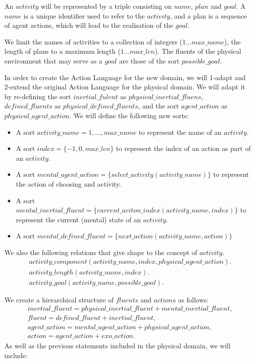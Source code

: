 \documentclass[11pt, oneside]{article}
\begin{document}
An $activity$ will be represented by a triple consisting on $name$, $plan$ and $goal$. A $name$ is a unique identifier used to refer to the $activity$, and a plan is a sequence of agent actions, which will lead to the realisation of the $goal$. 
 
We limit the names of activities to a collection of integers ($1\dots max\_name$), the length of plans to a maximum length ($1\dots max\_len$). The fluents of the physical environment that may serve as a $goal$ are those of the sort $possible\_goal$. 

In order to create the Action Language for the new domain, we will 1-adapt and 2-extend the original Action Language for the physical domain.
We will adapt it by re-defining the sort $inertial\_fulent$ as $physical\_inertial\_fluens$, $defined\_fluents$ as $physical\_defined\_fluents$, and the sort $agent\_action$ as $physical\_agent\_action$. We will define the following new sorts: 
\begin{itemize}
	\item A sort $activity\_name = {1,\dots, max\_name}$ to represent the name of an $activity$.	
	\item A sort $index = \{-1,0,max\_len\}$ to represent the index of an action as part of an $activity$. 
	\item A sort $mental\_agent\_action = \{select\_activity(activity\_name)\}$ to represent the action of choosing and activity.
	\item A sort $mental\_inertial\_fluent = \{current\_aciton\_index(activity\_name, index)\}$  to represent the current (mental) state of an $activity$. 
	\item A sort $mental\_defined\_fluent = \{next\_action(activity\_name, action) \}$ 
\end{itemize}
We also the following relations that give shape to the concept of $activity$. 	
	\begin{align*}
	&activity\_component(activity\_name, index, physical\_agent\_action).\\
	&activity\_length(activity\_name, index).\\
	&activity\_goal(activity\_name, possible\_goal).
	\end{align*}
	
We create a hierarchical structure of $fluents$ and $actions$ as follows: 
\begin{align*}
&inertial\_fluent = physical\_inertial\_fluent + mental\_inertial\_fluent, \\
&fluent = defined\_fluent + inertial\_fluent, \\
&agent\_action = mental\_agent\_action + physical\_agent\_action, \\
&action = agent\_action + exo\_action.
\end{align*}
As well as the previous statements included in the physical domain, we will include:
	
\end{document}
